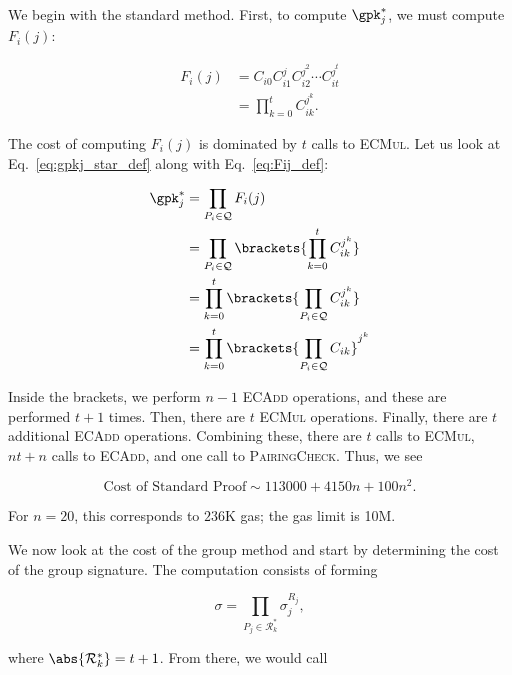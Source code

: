

We begin with the standard method.
First, to compute $\gpk_{j}^{*}$, we must compute $F_{i}(j)$:

\begin{align}
    F_{i}(j) &= C_{i0}C_{i1}^{j}C_{i2}^{j^{2}}\cdots C_{it}^{j^{t}} \nonumber\\
        &= \prod_{k=0}^{t} C_{ik}^{j^{k}}.
    \label{eq:Fij_def}
\end{align}

\noindent
The cost of computing $F_{i}(j)$ is dominated by $t$ calls to \textsc{ECMul}.
Let us look at Eq.~\eqref{eq:gpkj_star_def} along with Eq.~\eqref{eq:Fij_def}:

\begin{align}
    \gpk_{j}^{*} &= \prod_{P_{i}\in\mathcal{Q}}F_{i}(j) \nonumber\\
        &= \prod_{P_{i}\in\mathcal{Q}}
                \brackets{\prod_{k=0}^{t} C_{ik}^{j^{k}}}
            \nonumber\\
        &= \prod_{k=0}^{t}
            \brackets{\prod_{P_{i}\in\mathcal{Q}} C_{ik}^{j^{k}}} \nonumber\\
        &= \prod_{k=0}^{t}
            \brackets{\prod_{P_{i}\in\mathcal{Q}} C_{ik}}^{j^{k}}
\end{align}

\noindent
Inside the brackets, we perform $n-1$ \textsc{ECAdd} operations,
and these are performed $t+1$ times.
Then, there are $t$ \textsc{ECMul} operations.
Finally, there are $t$ additional \textsc{ECAdd} operations.
Combining these, there are $t$ calls to \textsc{ECMul},
$nt + n$ calls to \textsc{ECAdd}, and one call to \textsc{PairingCheck}.
Thus, we see

\begin{equation}
    \text{Cost of Standard Proof} \sim 113000 + 4150n + 100n^{2}.
    \label{eq:cost_standard}
\end{equation}

\noindent
For $n=20$, this corresponds to $236$K gas;
the gas limit is 10M.

We now look at the cost of the group method
and start by determining the cost of the group signature.
The computation consists of forming

\begin{equation}
    \sigma = \prod_{P_{j}\in\mathcal{R}^{*}_{k}} \sigma_{j}^{R_{j}},
\end{equation}

\noindent
where $\abs{\mathcal{R}^{*}_{k}} = t+1$.
From there, we would call

